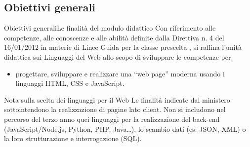 \documentclass[italian]{beamer}
\begin{document}
\subsection[Finalit\`a]{Obiettivi generali}
\begin{frame}{Obiettivi generali}{Le finalit\`a del modulo didattico}
	Con riferimento alle competenze, alle conoscenze e alle abilit\`a definite dalla Direttiva n. 4 del 16/01/2012 in materie di Linee Guida per la classe prescelta \hyperlink{dir:16012012}{}, si raffina l'unit\`a didattica sui Linguaggi del Web allo scopo di sviluppare le competenze per:
	
	\begin{itemize}
		\item \alert{progettare, sviluppare e realizzare una ``web page'' moderna
		usando i linguaggi HTML, CSS e JavaScript.}
	\end{itemize}
	
	\begin{exampleblock}{Nota sulla scelta dei linguaggi per il Web}
		Le finalit\`a indicate dal ministero sottointendono la realizzazione di pagine lato client. Non si includono nel percorso del terzo anno quei linguaggi per la realizzazione del back-end (JavaScript/Node.js, Python, PHP, Java\ldots{}), lo scambio dati (es: JSON, XML) o la loro strutturazione e interrogazione (SQL).
	\end{exampleblock}
	\note{%
		
	}%
\end{frame}
\end{document}
